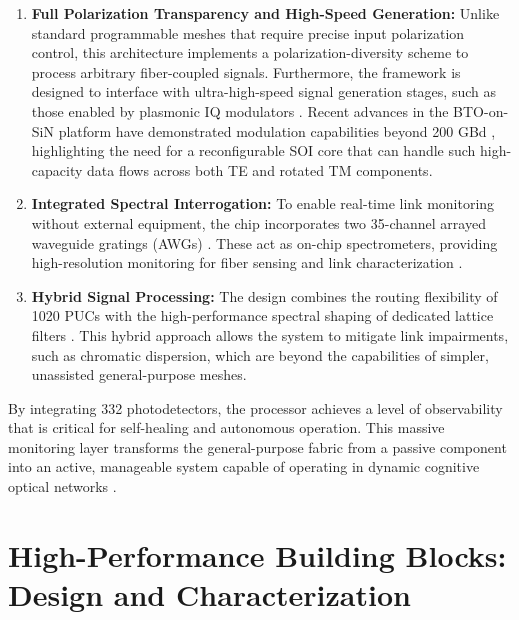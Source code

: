 \begin{enumerate}
    \item \textbf{Full Polarization Transparency and High-Speed Generation:} Unlike standard 
    programmable meshes that require precise input polarization control, this architecture 
    implements a polarization-diversity scheme to process arbitrary fiber-coupled signals. 
    Furthermore, the framework is designed to interface with ultra-high-speed signal generation 
    stages, such as those enabled by plasmonic IQ modulators 
    \cite{smajicPlasmonicElectroOpticModulators2024}. Recent advances in the BTO-on-SiN platform 
    have demonstrated modulation capabilities beyond 200 
    GBd \cite{kohliPlasmonicBTOonSiNPlatform2025}, highlighting the need for a reconfigurable SOI 
    core that can handle such high-capacity data flows across both TE and rotated TM components.

    \item \textbf{Integrated Spectral Interrogation:} To enable real-time link monitoring without 
    external equipment, the chip incorporates two 35-channel arrayed waveguide gratings 
    (AWGs) \cite{Santome2026_ECIO}. These act as on-chip spectrometers, providing high-resolution 
    monitoring for fiber sensing and link characterization \cite{pathakComparisonAWGsEchelle2014}.
    
    \item \textbf{Hybrid Signal Processing:} The design combines the routing flexibility of 1020 PUCs 
    with the high-performance spectral shaping of dedicated lattice filters \cite{Santome2026_ECIO}. This 
    hybrid approach allows the system to mitigate link impairments, such as chromatic dispersion, 
    which are beyond the capabilities of simpler, unassisted general-purpose meshes.
\end{enumerate}

By integrating 332 photodetectors, the processor achieves a level of observability that is critical 
for self-healing and autonomous operation. This massive monitoring layer transforms the 
general-purpose fabric from a passive component into an active, manageable system capable of 
operating in dynamic cognitive optical networks \cite{torrijos-moranIndustryInsightPhotonics2026}.



\section{High-Performance Building Blocks: Design and Characterization}
\label{sec:hpb_design}

